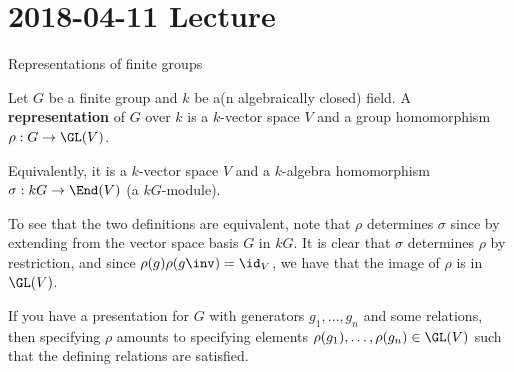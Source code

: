 \section{2018-04-11 Lecture}

Representations of finite groups

\begin{defn}
	Let $G$ be a finite group and $k$ be a(n algebraically closed) field.
	A \textbf{representation} of $G$ over $k$ is a $k$-vector space $V$ and a group homomorphism $\rho: G \to \GL(V)$.
	
	Equivalently, it is a $k$-vector space $V$ and a $k$-algebra homomorphism $\sigma: kG \to \End(V)$ (a $kG$-module).
\end{defn}

\begin{rmk}
	To see that the two definitions are equivalent, note that $\rho$ determines $\sigma$ since by extending from the vector space basis $G$ in $kG$.
	It is clear that $\sigma$ determines $\rho$ by restriction, and since $\rho(g)\rho(g\inv)=\id_V$, we have that the image of $\rho$ is in $\GL(V)$.
\end{rmk}

\begin{rmk}
	If you have a presentation for $G$ with generators $g_1,\ldots,g_n$ and some relations, then specifying $\rho$ amounts to specifying elements $\rho(g_1),\ldots,\rho(g_n) \in \GL(V)$ such that the defining relations are satisfied.
\end{rmk}

